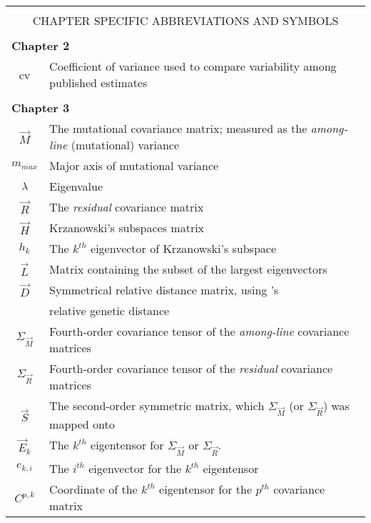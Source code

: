 \begin{table}[htp]
\begin{center}
\renewcommand{\arraystretch}{1.3} %
\begin{tabular}{cl}
&\\
\multicolumn{2}{c}{\MakeUppercase{Chapter Specific Abbreviations and Symbols}}\\
&\\
\multicolumn{2}{l}{\textbf{Chapter 2}}\\
\midrule
cv & Coefficient of variance used to compare variability among published estimates\\
&\\
\multicolumn{2}{l}{\textbf{Chapter 3}}\\
\midrule
$\vec{M}$ & The mutational covariance matrix; measured as the \textit{among-line} (mutational) variance \\
$m_{max}$ & Major axis of mutational variance \\
$\lambda$ & Eigenvalue \\
$\vec{R}$ & The \textit{residual} covariance matrix \\
$\vec{H}$ & Krzanowski’s subspaces matrix\\
$h_k$ & The $k^{th}$ eigenvector of Krzanowski’s subspace \\
$\vec{L}$ & Matrix containing the subset of the largest eigenvectors\\
$\vec{D}$ & Symmetrical relative distance matrix, using \citet{Mitt09}’s \\[-0.8ex]
& relative genetic distance\\
\textbf{$\Sigma$}$_{\vec{M}}$ & Fourth-order covariance tensor of the \textit{among-line} covariance matrices\\
\textbf{$\Sigma$}$_{\vec{R}}$ & Fourth-order covariance tensor of the \textit{residual} covariance matrices\\
$\vec{S}$ & The second-order symmetric matrix, which \textbf{$\Sigma$}$_{\vec{M}}$ (or \textbf{$\Sigma$}$_{\vec{R}}$) was mapped onto\\ 
$\vec{E}_k$ & The $k^{th}$ eigentensor for \textbf{$\Sigma$}$_{\vec{M}}$ or \textbf{$\Sigma$}$_{\vec{R}}$. \\
$e_{k,i}$ & The $i^{th}$ eigenvector for the $k^{th}$ eigentensor\\
$C^{p,k}$ & Coordinate of the $k^{th}$ eigentensor for the $p^{th}$ covariance matrix\\

\end{tabular}
\end{center}
\end{table}
